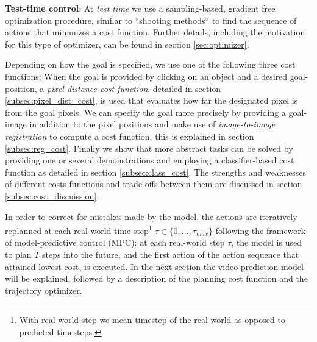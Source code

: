 \textbf{Test-time control}: At \emph{test time} we use a sampling-based, gradient free optimization procedure, similar to ``shooting methods`` to find the sequence of actions that minimizes a cost function. Further details, including the motivation for this type of optimizer, can be found in section \ref{sec:optimizer}. 

 Depending on how the goal is specified, we use one of the following three cost functions: When the goal is provided by clicking on an object and a desired goal-position, a \emph{pixel-distance cost-function}, detailed in section \ref{subsec:pixel_dist_cost}, is used that evaluates how far the designated pixel is from the goal pixels. We can specify the goal more precisely by providing a goal-image in addition to the pixel positions and make use of \emph{image-to-image registration} to compute a cost function, this is explained in section \ref{subsec:reg_cost}. Finally we show that more abstract tasks can be solved by providing one or several demonstrations and employing a classifier-based cost function as detailed in section \ref{subsec:class_cost}. The strengths and weaknesses of different costs functions and trade-offs between them are discussed in section \ref{subsec:cost_discuission}. 

In order to correct for mistakes made by the model, the actions are iteratively replanned at each real-world time step\footnote{With real-world step we mean timestep of the real-world as opposed to predicted timesteps.} $\tau \in \{0,...,\tau_{max}\}$ following the framework of model-predictive control (MPC): at each real-world step $\tau$, the model is used to plan $T$ steps into the future, and the first action of the action sequence that attained lowest cost, is executed.
In the next section the video-prediction model will be explained, followed by a description of the planning cost function and the trajectory optimizer.








